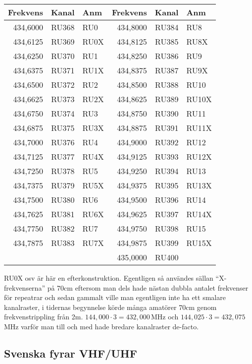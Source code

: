 \begin{longtable}{rrl|rrl}
\textbf{Frekvens} & \textbf{Kanal} & \textbf{Anm}
&  \textbf{Frekvens} & \textbf{Kanal} & \textbf{Anm} \\ \hline

434,6000 & RU368 & RU0  & 434,8000 & RU384 & RU8   \\
434,6125 & RU369 & RU0X & 434,8125 & RU385 & RU8X  \\
434,6250 & RU370 & RU1  & 434,8250 & RU386 & RU9   \\
434,6375 & RU371 & RU1X & 434,8375 & RU387 & RU9X  \\
434,6500 & RU372 & RU2  & 434,8500 & RU388 & RU10  \\
434,6625 & RU373 & RU2X & 434,8625 & RU389 & RU10X \\
434,6750 & RU374 & RU3  & 434,8750 & RU390 & RU11  \\
434,6875 & RU375 & RU3X & 434,8875 & RU391 & RU11X \\
434,7000 & RU376 & RU4  & 434,9000 & RU392 & RU12  \\
434,7125 & RU377 & RU4X & 434,9125 & RU393 & RU12X \\
434,7250 & RU378 & RU5  & 434,9250 & RU394 & RU13  \\
434,7375 & RU379 & RU5X & 434,9375 & RU395 & RU13X \\
434,7500 & RU380 & RU6  & 434,9500 & RU396 & RU14  \\
434,7625 & RU381 & RU6X & 434,9625 & RU397 & RU14X \\
434,7750 & RU382 & RU7  & 434,9750 & RU398 & RU15  \\
434,7875 & RU383 & RU7X & 434,9875 & RU399 & RU15X \\
         &       &      & 435,0000 & RU400 &       \\

\end{longtable}

RU0X osv är här en efterkonstruktion. Egentligen så användes sällan
``X-frekvenserna'' på 70cm eftersom man dels hade nästan dubbla
antalet frekvenser för repeatrar och sedan gammalt ville man
egentligen inte ha ett smalare kanalraster, i tidernas begynnelse
körde många amatörer 70cm genom frekvenstrippling från 2m. $144,000
\cdot 3 = 432,000$\,MHz och $144,025 \cdot 3 = 432,075$\,MHz varför
man till och med hade bredare kanalraster de-facto.


\subsection{Svenska fyrar VHF/UHF}

